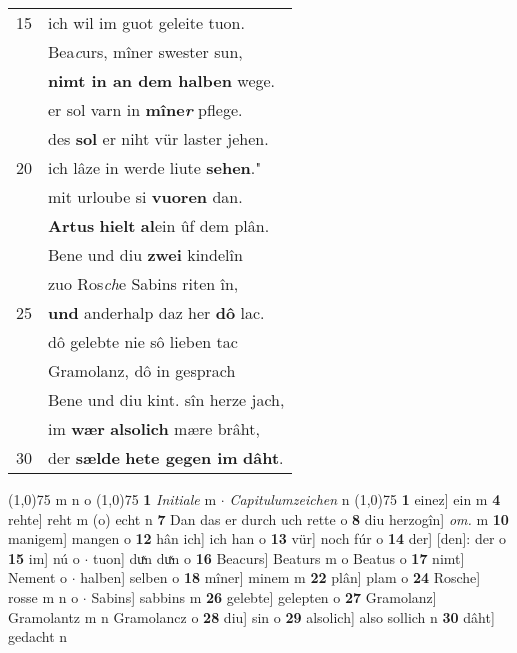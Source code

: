 \documentclass[8pt,a4paper,notitlepage]{article}
\begin{document}
\begin{table}[ht]
\begin{minipage}[t]{0.5\linewidth}
\begin{tabular}{rl}
15 & ich wil im guot geleite tuon.\\ 
 & Bea\textit{c}urs, mîner swester sun,\\ 
 & \textbf{nimt in an dem halben} wege.\\ 
 & er sol varn in \textbf{mîne\textit{r}} pflege.\\ 
 & des \textbf{sol} er niht vür laster jehen.\\ 
20 & ich lâze in werde liute \textbf{sehen}."\\ 
 & mit urloube si \textbf{vuoren} dan.\\ 
 & \textbf{Artus} \textbf{hielt} \textbf{al}ein ûf dem plân.\\ 
 & Bene und diu \textbf{zwei} kindelîn\\ 
 & zuo Ros\textit{ch}e Sabins riten în,\\ 
25 & \textbf{und} anderhalp daz her \textbf{dô} lac.\\ 
 & dô gelebte nie sô lieben tac\\ 
 & Gramolanz, dô in gesprach\\ 
 & Bene und diu kint. sîn herze jach,\\ 
 & im \textbf{wær} \textbf{al}\textbf{solich} mære brâht,\\ 
30 & der \textbf{sælde} \textbf{hete gegen im} \textbf{dâht}.\\ 
\end{tabular}
\scriptsize
\line(1,0){75} \newline
m n o \newline
\line(1,0){75} \newline
\textbf{1} \textit{Initiale} m   $\cdot$ \textit{Capitulumzeichen} n  \newline
\line(1,0){75} \newline
\textbf{1} einez] ein m \textbf{4} rehte] reht m (o) echt n \textbf{7} Dan das er durch uch rette o \textbf{8} diu herzogîn] \textit{om.} m \textbf{10} manigem] mangen o \textbf{12} hân ich] ich han o \textbf{13} vür] noch fúr o \textbf{14} der] [den]: der o \textbf{15} im] nú o  $\cdot$ tuon] duͯn duͯn o \textbf{16} Beacurs] Beaturs m o Beatus o \textbf{17} nimt] Nement o  $\cdot$ halben] selben o \textbf{18} mîner] minem m \textbf{22} plân] plam o \textbf{24} Rosche] rosse m n o  $\cdot$ Sabins] sabbins m \textbf{26} gelebte] gelepten o \textbf{27} Gramolanz] Gramolantz m n Gramolancz o \textbf{28} diu] sin o \textbf{29} alsolich] also sollich n \textbf{30} dâht] gedacht n \newline
\end{minipage}
\end{table}
\end{document}
